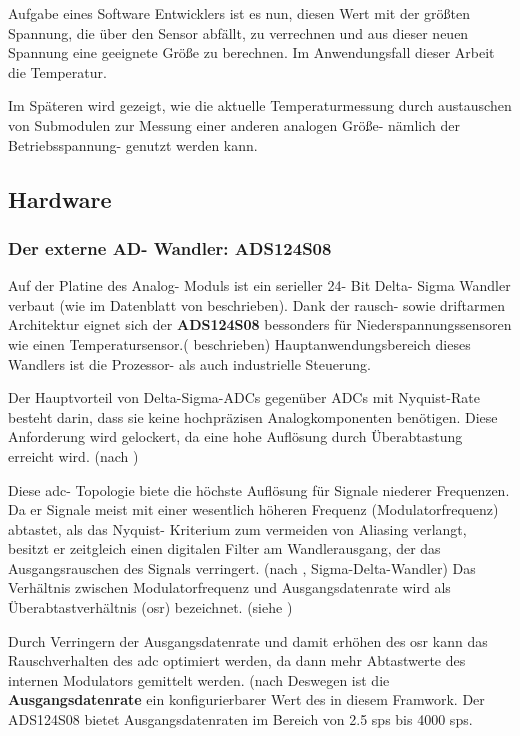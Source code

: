 Aufgabe eines Software Entwicklers ist es nun, diesen Wert mit der größten Spannung, die über den Sensor abfällt, zu verrechnen und aus dieser neuen Spannung eine geeignete Größe zu berechnen. Im Anwendungsfall dieser Arbeit die Temperatur.

Im Späteren wird gezeigt, wie die aktuelle Temperaturmessung durch austauschen von Submodulen zur Messung einer anderen analogen Größe- nämlich der Betriebsspannung- genutzt werden kann.

\subsection{Hardware}
\label{subsec:hardware}


\subsubsection{Der externe AD- Wandler: ADS124S08}
\label{subsubsec:external-adc}

Auf der Platine des Analog- Moduls ist ein serieller 24- Bit Delta- Sigma Wandler verbaut (wie im Datenblatt von \textcite[][1]{TexasInstruments.2016} beschrieben).
Dank der rausch- sowie driftarmen Architektur eignet sich der \textbf{ADS124S08} bessonders für Niederspannungssensoren wie einen Temperatursensor.(\textcite[][29]{TexasInstruments.2016} beschrieben)\newline
Hauptanwendungsbereich dieses Wandlers ist die Prozessor- als auch industrielle Steuerung.

Der Hauptvorteil von Delta-Sigma-ADCs gegenüber ADCs mit Nyquist-Rate besteht darin, dass sie keine hochpräzisen Analogkomponenten benötigen. 
Diese Anforderung wird gelockert, da eine hohe Auflösung durch Überabtastung erreicht wird. (nach \textcite[][6]{Khalil.2015})

Diese \ac{adc}- Topologie biete die höchste Auflösung für Signale niederer Frequenzen.
Da er Signale meist mit einer wesentlich höheren Frequenz (Modulatorfrequenz) abtastet, als das Nyquist- Kriterium zum vermeiden von Aliasing verlangt, besitzt er zeitgleich einen digitalen Filter am Wandlerausgang, der das Ausgangsrauschen des Signals verringert. (nach \textcite[][]{RichMiron.01.Aug.2018}, Sigma-Delta-Wandler) \newline
Das Verhältnis zwischen Modulatorfrequenz und Ausgangsdatenrate wird als Überabtastverhältnis (\ac{osr}) bezeichnet. (siehe \textcite[][24]{TexasInstruments.2016})

Durch Verringern der Ausgangsdatenrate und damit erhöhen des \ac{osr} kann das Rauschverhalten des \ac{adc} optimiert werden, da dann mehr Abtastwerte des internen Modulators gemittelt werden. (nach \textcite[][24]{TexasInstruments.2016}
Deswegen ist die \textbf{Ausgangsdatenrate} ein konfigurierbarer Wert des in diesem Framwork.\newline
Der ADS124S08 bietet Ausgangsdatenraten im Bereich von 2.5 \ac{sps} bis 4000 \ac{sps}.

